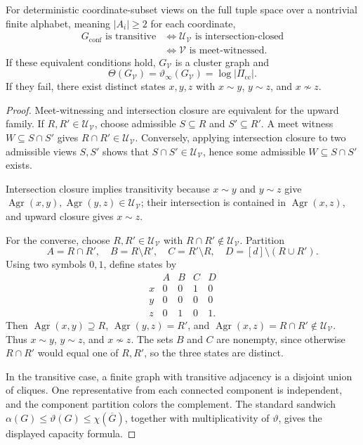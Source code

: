 \documentclass[10pt,a4paper]{amsart}
\begin{document}
\begin{theorem}\label{thm:intersection-closure}
For deterministic coordinate-subset views on the full tuple space over a nontrivial finite alphabet, meaning \( |A_i|\ge 2 \) for each coordinate,
\[
\begin{aligned}
G_{\mathrm{conf}}\text{ is transitive}
&\Longleftrightarrow
\mathcal U_{\mathcal V}\text{ is intersection-closed}\\
&\Longleftrightarrow
\mathcal V\text{ is meet-witnessed}.
\end{aligned}
\]
If these equivalent conditions hold, \(G_{\mathcal V}\) is a cluster graph and
\[
\Theta(G_{\mathcal V})=\vartheta_\infty(G_{\mathcal V})=\log |\Pi_{\mathrm{cc}}|.
\]
If they fail, there exist distinct states \(x,y,z\) with \(x\sim y\), \(y\sim z\), and \(x\not\sim z\).
\end{theorem}

\begin{proof}
Meet-witnessing and intersection closure are equivalent for the upward family. If \(R,R'\in\mathcal U_{\mathcal V}\), choose admissible \(S\subseteq R\) and \(S'\subseteq R'\). A meet witness \(W\subseteq S\cap S'\) gives \(R\cap R'\in\mathcal U_{\mathcal V}\). Conversely, applying intersection closure to two admissible views \(S,S'\) shows that \(S\cap S'\in\mathcal U_{\mathcal V}\), hence some admissible \(W\subseteq S\cap S'\) exists.

Intersection closure implies transitivity because \(x\sim y\) and \(y\sim z\) give \(\operatorname{Agr}(x,y),\operatorname{Agr}(y,z)\in\mathcal U_{\mathcal V}\); their intersection is contained in \(\operatorname{Agr}(x,z)\), and upward closure gives \(x\sim z\).

For the converse, choose \(R,R'\in\mathcal U_{\mathcal V}\) with \(R\cap R'\notin\mathcal U_{\mathcal V}\). Partition
\[
A=R\cap R',\quad B=R\setminus R',\quad C=R'\setminus R,\quad D=[d]\setminus(R\cup R').
\]
Using two symbols \(0,1\), define states by
\[
\begin{array}{c|cccc}
 & A & B & C & D\\ \hline
x & 0 & 0 & 1 & 0\\
y & 0 & 0 & 0 & 0\\
z & 0 & 1 & 0 & 1 .
\end{array}
\]
Then \(\operatorname{Agr}(x,y)\supseteq R\), \(\operatorname{Agr}(y,z)=R'\), and \(\operatorname{Agr}(x,z)=R\cap R'\notin\mathcal U_{\mathcal V}\). Thus \(x\sim y\), \(y\sim z\), and \(x\not\sim z\). The sets \(B\) and \(C\) are nonempty, since otherwise \(R\cap R'\) would equal one of \(R,R'\), so the three states are distinct.

In the transitive case, a finite graph with transitive adjacency is a disjoint union of cliques. One representative from each connected component is independent, and the component partition colors the complement. The standard sandwich \(\alpha(G)\le \vartheta(G)\le\chi(\overline G)\), together with multiplicativity of \(\vartheta\), gives the displayed capacity formula.
\end{proof}
\end{document}
